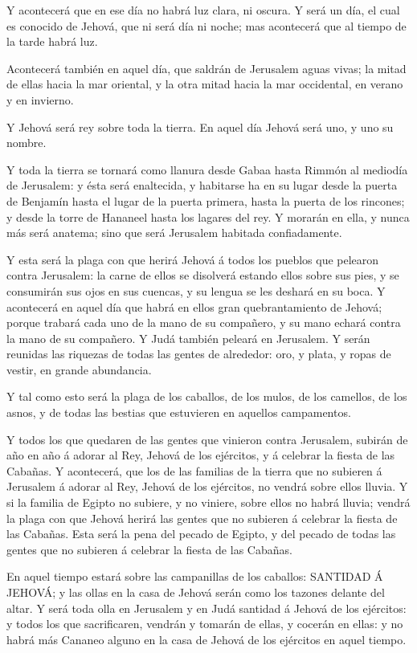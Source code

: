  Y acontecerá que en ese día no habrá luz clara, ni oscura.
 Y será un día, el cual es conocido de Jehová, que ni será
día ni noche; mas acontecerá que al tiempo de la tarde habrá luz.

 Acontecerá también en aquel día, que saldrán de Jerusalem
aguas vivas; la mitad de ellas hacia la mar oriental, y la otra mitad
hacia la mar occidental, en verano y en invierno.

 Y Jehová será rey sobre toda la tierra. En aquel día Jehová
será uno, y uno su nombre.

 Y toda la tierra se tornará como llanura desde Gabaa hasta
Rimmón al mediodía de Jerusalem: y ésta será enaltecida, y habitarse ha
en su lugar desde la puerta de Benjamín hasta el lugar de la puerta
primera, hasta la puerta de los rincones; y desde la torre de Hananeel
hasta los lagares del rey.  Y morarán en ella, y nunca más
será anatema; sino que será Jerusalem habitada confiadamente.

 Y esta será la plaga con que herirá Jehová á todos los
pueblos que pelearon contra Jerusalem: la carne de ellos se disolverá
estando ellos sobre sus pies, y se consumirán sus ojos en sus cuencas, y
su lengua se les deshará en su boca.  Y acontecerá en aquel
día que habrá en ellos gran quebrantamiento de Jehová; porque trabará
cada uno de la mano de su compañero, y su mano echará contra la mano de
su compañero.  Y Judá también peleará en Jerusalem. Y serán
reunidas las riquezas de todas las gentes de alrededor: oro, y plata, y
ropas de vestir, en grande abundancia.

 Y tal como esto será la plaga de los caballos, de los
mulos, de los camellos, de los asnos, y de todas las bestias que
estuvieren en aquellos campamentos.

 Y todos los que quedaren de las gentes que vinieron contra
Jerusalem, subirán de año en año á adorar al Rey, Jehová de los
ejércitos, y á celebrar la fiesta de las Cabañas.  Y
acontecerá, que los de las familias de la tierra que no subieren á
Jerusalem á adorar al Rey, Jehová de los ejércitos, no vendrá sobre
ellos lluvia.  Y si la familia de Egipto no subiere, y no
viniere, sobre ellos no habrá lluvia; vendrá la plaga con que Jehová
herirá las gentes que no subieren á celebrar la fiesta de las Cabañas.
 Esta será la pena del pecado de Egipto, y del pecado de
todas las gentes que no subieren á celebrar la fiesta de las Cabañas.

 En aquel tiempo estará sobre las campanillas de los
caballos: SANTIDAD Á JEHOVÁ; y las ollas en la casa de Jehová serán como
los tazones delante del altar.  Y será toda olla en
Jerusalem y en Judá santidad á Jehová de los ejércitos: y todos los que
sacrificaren, vendrán y tomarán de ellas, y cocerán en ellas: y no habrá
más Cananeo alguno en la casa de Jehová de los ejércitos en aquel
tiempo.
